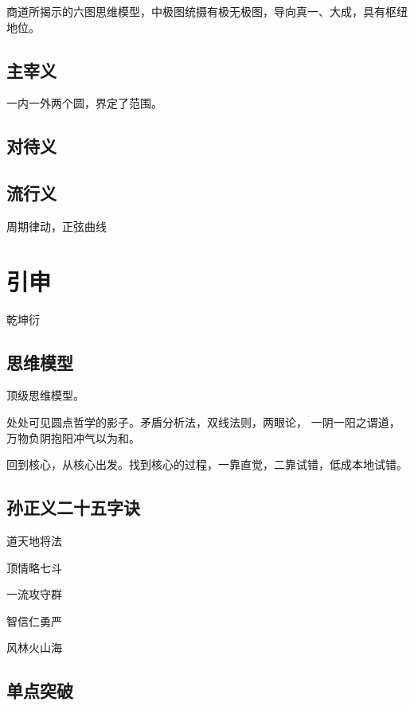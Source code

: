 商道所揭示的六图思维模型，中极图统摄有极无极图，导向真一、大成，具有枢纽地位。

\subsection{主宰义}

一内一外两个圆，界定了范围。

\subsection{对待义}

\subsection{流行义}

周期律动，正弦曲线

\section{引申}

乾坤衍

\subsection{思维模型}

顶级思维模型。

处处可见圆点哲学的影子。矛盾分析法，双线法则，两眼论，
一阴一阳之谓道，万物负阴抱阳冲气以为和。

回到核心，从核心出发。找到核心的过程，一靠直觉，二靠试错，低成本地试错。

\subsection{孙正义二十五字诀}

\begin{shadequote}
\item 道天地将法
\item 顶情略七斗
\item 一流攻守群
\item 智信仁勇严
\item 风林火山海
\end{shadequote}

\subsection{单点突破}

